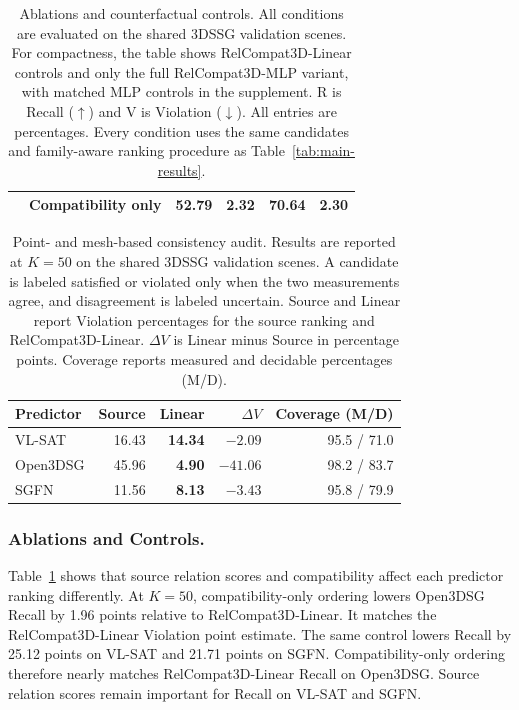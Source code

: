 \begin{table}[!t]
{\begin{tabular}{@{}llrrrr@{}}
    & Compatibility only & 52.79 & 2.32 & 70.64 & 2.30 \\
    \bottomrule
    \end{tabular}
    }
    \caption{Ablations and counterfactual controls. All conditions are evaluated on the shared 3DSSG validation scenes. For compactness, the table shows RelCompat3D-Linear controls and only the full RelCompat3D-MLP variant, with matched MLP controls in the supplement. R is Recall ($\uparrow$) and V is Violation ($\downarrow$). All entries are percentages. Every condition uses the same candidates and family-aware ranking procedure as Table~\ref{tab:main-results}.}
    \label{tab:ablations}
\end{table}

\begin{table}[t]
    \centering
    {\small
    \setlength{\tabcolsep}{1.5pt}
    \begin{tabular}{@{}lrrrr@{}}
    \toprule
    Predictor & Source & Linear & $\Delta V$ & Coverage (M/D) \\
    \midrule
    VL-SAT   & 16.43 & \textbf{14.34} & $-2.09$ & 95.5 / 71.0 \\
    Open3DSG & 45.96 & \textbf{4.90}  & $-41.06$ & 98.2 / 83.7 \\
    SGFN     & 11.56 & \textbf{8.13}  & $-3.43$ & 95.8 / 79.9 \\
    \bottomrule
    \end{tabular}
    }
    \caption{Point- and mesh-based consistency audit. Results are reported at \(K=50\) on the shared 3DSSG validation scenes. A candidate is labeled satisfied or violated only when the two measurements agree, and disagreement is labeled uncertain. Source and Linear report Violation percentages for the source ranking and RelCompat3D-Linear. \(\Delta V\) is Linear minus Source in percentage points. Coverage reports measured and decidable percentages (M/D).}
    \label{tab:surface-audit}
\end{table}
    
\subsubsection{Ablations and Controls.}
Table~\ref{tab:ablations} shows that source relation scores and compatibility affect each predictor ranking differently. At $K=50$, compatibility-only ordering lowers Open3DSG Recall by 1.96 points relative to RelCompat3D-Linear. It matches the RelCompat3D-Linear Violation point estimate. The same control lowers Recall by 25.12 points on VL-SAT and 21.71 points on SGFN. Compatibility-only ordering therefore nearly matches RelCompat3D-Linear Recall on Open3DSG. Source relation scores remain important for Recall on VL-SAT and SGFN.

